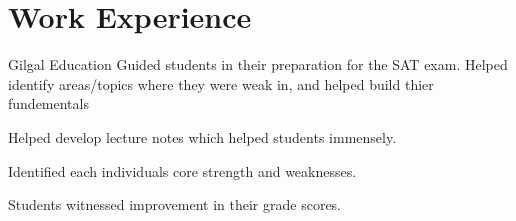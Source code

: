 \section{Work Experience}
\begin{experience}{Gilgal Education}{
}
Guided students in their preparation for the SAT exam.
Helped identify areas/topics where they were weak in, and helped build thier fundementals

\begin{contribs}
	\item{Helped develop lecture notes which helped students immensely.}
	\item{Identified each individuals core strength and weaknesses.}
	\item{Students witnessed improvement in their grade scores.}
\end{contribs}
\end{experience}




